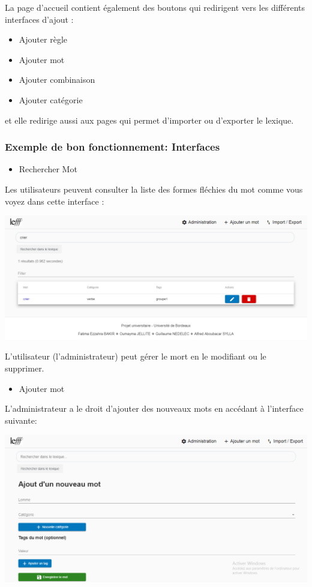 \documentclass[12pt,a4paper]{article}
\begin{document}
La page d'accueil contient également des boutons qui redirigent vers les différents interfaces d'ajout : 
\begin{itemize}
    \item   Ajouter règle
    \item   Ajouter mot
    \item   Ajouter combinaison
    \item   Ajouter catégorie
   \end{itemize}
et elle redirige aussi aux  pages qui permet d'importer ou d'exporter le lexique.


\subsubsection{Exemple de bon fonctionnement: Interfaces} 

\begin{itemize}  
  \item Rechercher Mot
\end{itemize}
Les utilisateurs peuvent consulter la liste des formes fléchies du mot comme vous voyez dans cette interface :


\includegraphics[width=150mm]{img/Recherche.PNG}



L’utilisateur (l’administrateur) peut gérer le mort en le modifiant ou le supprimer.


\begin{itemize}  
  \item Ajouter mot
\end{itemize}

L'administrateur a le droit d'ajouter des nouveaux mots  en accédant à l'interface suivante: 


\includegraphics[width=150mm]{img/Ajoutermot.PNG}
\end{document}
